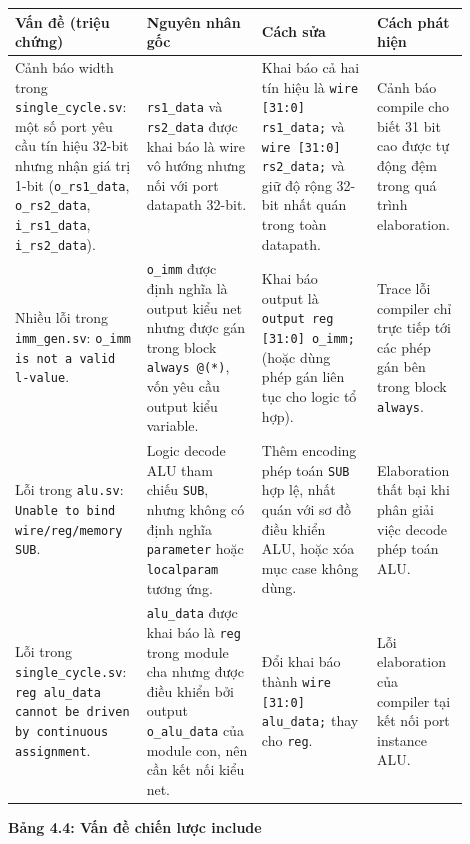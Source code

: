 \documentclass[10pt,a4paper]{article}
\begin{document}
\begin{center}
\small
\begin{tabular}{@{}p{0.24\linewidth}p{0.24\linewidth}p{0.24\linewidth}p{0.18\linewidth}@{}}
\toprule
\textbf{Vấn đề (triệu chứng)} & \textbf{Nguyên nhân gốc} & \textbf{Cách sửa} & \textbf{Cách phát hiện} \\
\midrule
Cảnh báo width trong \texttt{single\_cycle.sv}: một số port yêu cầu tín hiệu 32-bit nhưng nhận giá trị 1-bit (\texttt{o\_rs1\_data}, \texttt{o\_rs2\_data}, \texttt{i\_rs1\_data}, \texttt{i\_rs2\_data}). &
\texttt{rs1\_data} và \texttt{rs2\_data} được khai báo là wire vô hướng nhưng nối với port datapath 32-bit. &
Khai báo cả hai tín hiệu là \texttt{wire [31:0] rs1\_data;} và \texttt{wire [31:0] rs2\_data;} và giữ độ rộng 32-bit nhất quán trong toàn datapath. &
Cảnh báo compile cho biết 31 bit cao được tự động đệm trong quá trình elaboration. \\
\addlinespace
Nhiều lỗi trong \texttt{imm\_gen.sv}: \texttt{o\_imm is not a valid l-value}. &
\texttt{o\_imm} được định nghĩa là output kiểu net nhưng được gán trong block \texttt{always @(*)}, vốn yêu cầu output kiểu variable. &
Khai báo output là \texttt{output reg [31:0] o\_imm;} (hoặc dùng phép gán liên tục cho logic tổ hợp). &
Trace lỗi compiler chỉ trực tiếp tới các phép gán bên trong block \texttt{always}. \\
\addlinespace
Lỗi trong \texttt{alu.sv}: \texttt{Unable to bind wire/reg/memory SUB}. &
Logic decode ALU tham chiếu \texttt{SUB}, nhưng không có định nghĩa \texttt{parameter} hoặc \texttt{localparam} tương ứng. &
Thêm encoding phép toán \texttt{SUB} hợp lệ, nhất quán với sơ đồ điều khiển ALU, hoặc xóa mục case không dùng. &
Elaboration thất bại khi phân giải việc decode phép toán ALU. \\
\addlinespace
Lỗi trong \texttt{single\_cycle.sv}: \texttt{reg alu\_data cannot be driven by continuous assignment}. &
\texttt{alu\_data} được khai báo là \texttt{reg} trong module cha nhưng được điều khiển bởi output \texttt{o\_alu\_data} của module con, nên cần kết nối kiểu net. &
Đổi khai báo thành \texttt{wire [31:0] alu\_data;} thay cho \texttt{reg}. &
Lỗi elaboration của compiler tại kết nối port instance ALU. \\
\bottomrule
\end{tabular}
\end{center}

\textbf{Bảng 4.4: Vấn đề chiến lược include}
\end{document}
